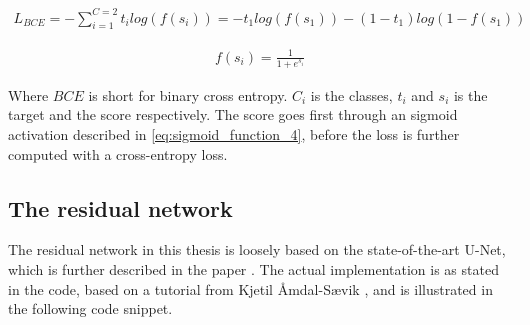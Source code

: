 \documentclass[USenglish]{ifimaster}  %
\begin{document}
\begin{equation}\label{eq:binary_cross_entropy}
\begin{aligned}
L_{BCE} = -\sum_{i=1}^{C=2}t_{i} log (f(s_{i})) = -t_{1} log(f(s_{1})) - (1 - t_{1}) log(1 - f(s_{1}))
\end{aligned}
\end{equation}

\begin{equation}\label{eq:sigmoid_function_4}
\begin{aligned}
f(s_i)= \frac{1}{1 + e^{s_i}}
\end{aligned}
\end{equation}

Where $BCE$ is short for binary cross entropy. $C_i$ is the classes, $t_i$ and $s_i$ is the target and the score respectively. The score goes first through an sigmoid activation described in \cref{eq:sigmoid_function_4}, before the loss is further computed with a cross-entropy loss.

\subsection{The residual network}
The residual network in this thesis is loosely based on the state-of-the-art U-Net, which is further described in the paper \cite{RFB15a_u-net}. The actual implementation is as stated in the code, based on a tutorial from Kjetil Åmdal-Sævik \cite{website:u-net_implementation}, and is illustrated in the following code snippet. 
\end{document}

